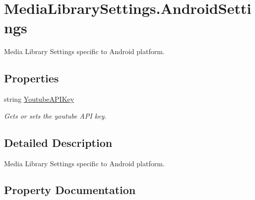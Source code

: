 \hypertarget{class_voxel_busters_1_1_native_plugins_1_1_media_library_settings_1_1_android_settings}{}\section{Media\+Library\+Settings.\+Android\+Settings}
\label{class_voxel_busters_1_1_native_plugins_1_1_media_library_settings_1_1_android_settings}


Media Library Settings specific to Android platform.  


\subsection*{Properties}
\begin{DoxyCompactItemize}
\item 
string \hyperlink{class_voxel_busters_1_1_native_plugins_1_1_media_library_settings_1_1_android_settings_a67e2bce453bc7f62227e0ee2a7ff4cf0}{Youtube\+A\+P\+I\+Key}
\begin{DoxyCompactList}\small\item\em Gets or sets the youtube A\+P\+I key. \end{DoxyCompactList}\end{DoxyCompactItemize}


\subsection{Detailed Description}
Media Library Settings specific to Android platform. 



\subsection{Property Documentation}
\hypertarget{class_voxel_busters_1_1_native_plugins_1_1_media_library_settings_1_1_android_settings_a67e2bce453bc7f62227e0ee2a7ff4cf0}{}
